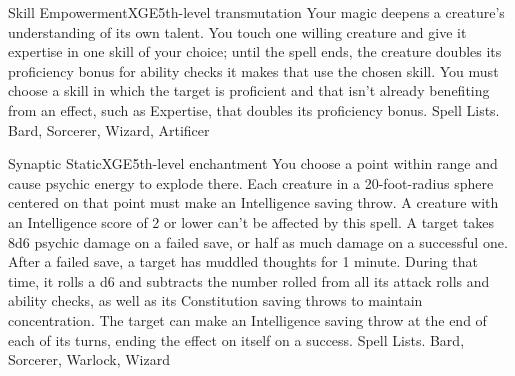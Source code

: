 \begin{spell}{Skill Empowerment}{XGE}{5th-level transmutation}
{
}
Your magic deepens a creature’s understanding of its own talent. You touch one willing creature and give it expertise in one skill of your choice; until the spell ends, the creature doubles its proficiency bonus for ability checks it makes that use the chosen skill.
You must choose a skill in which the target is proficient and that isn’t already benefiting from an effect, such as Expertise, that doubles its proficiency bonus.
Spell Lists. Bard, Sorcerer, Wizard, Artificer
\end{spell}

\begin{spell}{Synaptic Static}{XGE}{5th-level enchantment}
{
}
You choose a point within range and cause psychic energy to explode there. Each creature in a 20-foot-radius sphere centered on that point must make an Intelligence saving throw. A creature with an Intelligence score of 2 or lower can’t be affected by this spell. A target takes 8d6 psychic damage on a failed save, or half as much damage on a successful one.
After a failed save, a target has muddled thoughts for 1 minute. During that time, it rolls a d6 and subtracts the number rolled from all its attack rolls and ability checks, as well as its Constitution saving throws to maintain concentration. The target can make an Intelligence saving throw at the end of each of its turns, ending the effect on itself on a success.
Spell Lists. Bard, Sorcerer, Warlock, Wizard
\end{spell}

